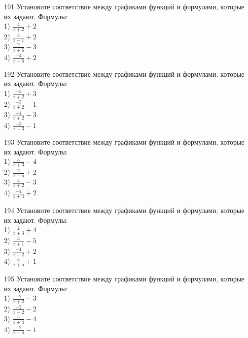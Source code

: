 \documentclass[4apaper]{article}
\begin{document}
\begin{taskBN}{191}
Установите соответствие между графиками функций и формулами, которые их задают. Формулы: \\1) $\frac{4}{x+2}+2$\\2) $\frac{3}{x-1}+2$\\3) $\frac{2}{x+6}-3$\\4) $\frac{-4}{x-6}+2$
\end{taskBN}

\begin{taskBN}{192}
Установите соответствие между графиками функций и формулами, которые их задают. Формулы: \\1) $\frac{-3}{x+2}+3$\\2) $\frac{-5}{x+2}-1$\\3) $\frac{-4}{x+2}-3$\\4) $\frac{-3}{x-3}-1$
\end{taskBN}

\begin{taskBN}{193}
Установите соответствие между графиками функций и формулами, которые их задают. Формулы: \\1) $\frac{3}{x+3}-4$\\2) $\frac{2}{x-5}+2$\\3) $\frac{4}{x+2}-3$\\4) $\frac{-4}{x+4}+2$
\end{taskBN}

\begin{taskBN}{194}
Установите соответствие между графиками функций и формулами, которые их задают. Формулы: \\1) $\frac{2}{x+3}+4$\\2) $\frac{3}{x+1}-5$\\3) $\frac{-1}{x-2}+2$\\4) $\frac{4}{x+5}+1$
\end{taskBN}

\begin{taskBN}{195}
Установите соответствие между графиками функций и формулами, которые их задают. Формулы: \\1) $\frac{-2}{x+2}-3$\\2) $\frac{-2}{x-2}-2$\\3) $\frac{5}{x+4}-4$\\4) $\frac{-2}{x-4}-1$
\end{taskBN}
\end{document}
